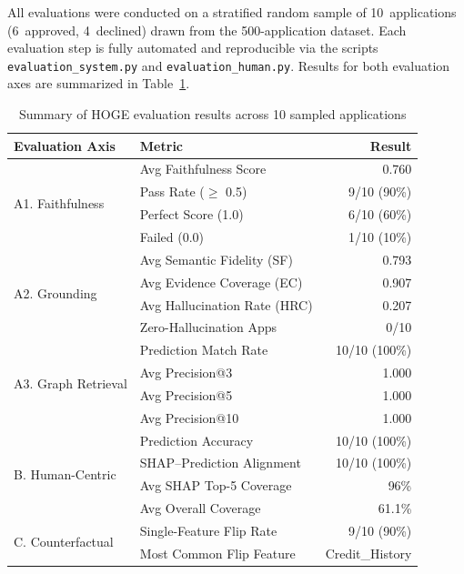 \documentclass[lnbip]{svmultln}
\begin{document}
All evaluations were conducted on a stratified random sample of 10~applications (6~approved, 4~declined) drawn from the 500-application dataset. Each evaluation step is fully automated and reproducible via the scripts \texttt{evaluation\_system.py} and \texttt{evaluation\_human.py}. Results for both evaluation axes are summarized in Table~\ref{tab:evalSummary}.


\begin{table}[htp]
    \centering
    \caption{Summary of HOGE evaluation results across 10 sampled applications}
    \label{tab:evalSummary}
    \begin{tabular}{l l r}
        \toprule
        \textbf{Evaluation Axis} & \textbf{Metric} & \textbf{Result} \\
        \midrule
        \multirow{4}{*}{A1. Faithfulness} 
            & Avg Faithfulness Score & 0.760 \\
            & Pass Rate ($\geq$ 0.5) & 9/10 (90\%) \\
            & Perfect Score (1.0) & 6/10 (60\%) \\
            & Failed (0.0) & 1/10 (10\%) \\
        \midrule
        \multirow{4}{*}{A2. Grounding} 
            & Avg Semantic Fidelity (SF) & 0.793 \\
            & Avg Evidence Coverage (EC) & 0.907 \\
            & Avg Hallucination Rate (HRC) & 0.207 \\
            & Zero-Hallucination Apps & 0/10 \\
        \midrule
        \multirow{4}{*}{A3. Graph Retrieval} 
            & Prediction Match Rate & 10/10 (100\%) \\
            & Avg Precision@3 & 1.000 \\
            & Avg Precision@5 & 1.000 \\
            & Avg Precision@10 & 1.000 \\
        \midrule
        \multirow{4}{*}{B. Human-Centric} 
            & Prediction Accuracy & 10/10 (100\%) \\
            & SHAP--Prediction Alignment & 10/10 (100\%) \\
            & Avg SHAP Top-5 Coverage & 96\% \\
            & Avg Overall Coverage & 61.1\% \\
        \midrule
        \multirow{2}{*}{C. Counterfactual}
            & Single-Feature Flip Rate & 9/10 (90\%) \\
            & Most Common Flip Feature & Credit\_History \\
        \bottomrule
    \end{tabular}
\end{table}
\end{document}

